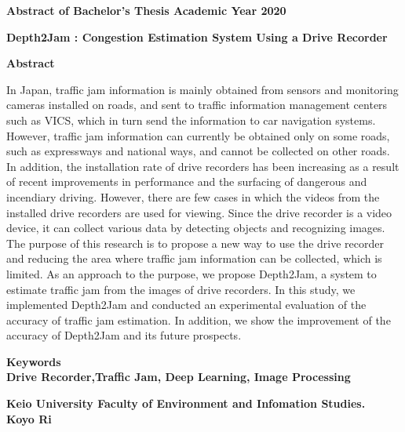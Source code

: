 \begin{center}
\textbf{\large Abstract of Bachelor's Thesis Academic Year 2020}

\vspace{6mm}

\textbf{\large Depth2Jam : Congestion Estimation System Using a Drive Recorder}

\end{center}

\vspace{10mm}


\begin{flushleft}
\textbf{Abstract}\\
\end{flushleft}
In Japan, traffic jam information is mainly obtained from sensors and monitoring cameras installed on roads, and sent to traffic information management centers such as VICS, which in turn send the information to car navigation systems.
However, traffic jam information can currently be obtained only on some roads, such as expressways and national ways, and cannot be collected on other roads.
In addition, the installation rate of drive recorders has been increasing as a result of recent improvements in performance and the surfacing of dangerous and incendiary driving.
However, there are few cases in which the videos from the installed drive recorders are used for viewing.
Since the drive recorder is a video device, it can collect various data by detecting objects and recognizing images.
The purpose of this research is to propose a new way to use the drive recorder and reducing the area where traffic jam information can be collected, which is limited.
As an approach to the purpose, we propose Depth2Jam, a system to estimate traffic jam from the images of drive recorders.
In this study, we implemented Depth2Jam and conducted an experimental evaluation of the accuracy of traffic jam estimation.
In addition, we show the improvement of the accuracy of Depth2Jam and its future prospects.

\begin{flushleft}
\textbf{Keywords}\\
\textbf{Drive Recorder,Traffic Jam, Deep Learning, Image Processing}
\end{flushleft}

\begin{flushright}
\textbf{Keio University Faculty of Environment and Infomation Studies.}\\
\textbf{Koyo Ri}\\
\end{flushright}
